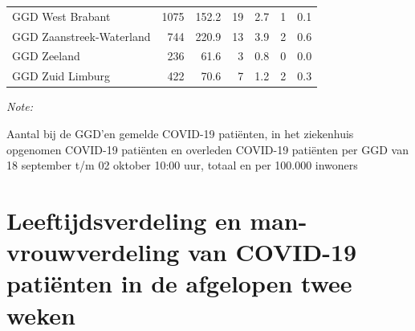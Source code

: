 \documentclass[
  english,
  man,floatsintext]{apa6}
\begin{document}
\begin{table}[H]
\begin{threeparttable}
\begin{tabular}{lrrrrrr}
GGD West Brabant & 1075 & 152.2 & 19 & 2.7 & 1 & 0.1\\
GGD Zaanstreek-Waterland & 744 & 220.9 & 13 & 3.9 & 2 & 0.6\\
GGD Zeeland & 236 & 61.6 & 3 & 0.8 & 0 & 0.0\\
GGD Zuid Limburg & 422 & 70.6 & 7 & 1.2 & 2 & 0.3\\
\bottomrule
\end{tabular}
\begin{tablenotes}
\item \textit{Note: } 
\item Aantal bij de GGD’en gemelde COVID-19 patiënten, in het ziekenhuis opgenomen COVID-19 patiënten en overleden COVID-19 patiënten per GGD van 18 september t/m 02 oktober 10:00 uur, totaal en per 100.000 inwoners
\end{tablenotes}
\end{threeparttable}
\endgroup{}
\end{table}

\newpage

\hypertarget{leeftijdsverdeling-en-man-vrouwverdeling-van-covid-19-patiuxebnten-in-de-afgelopen-twee-weken}{%
\section{Leeftijdsverdeling en man-vrouwverdeling van COVID-19 patiënten in de afgelopen twee weken}\label{leeftijdsverdeling-en-man-vrouwverdeling-van-covid-19-patiuxebnten-in-de-afgelopen-twee-weken}}
\end{document}
